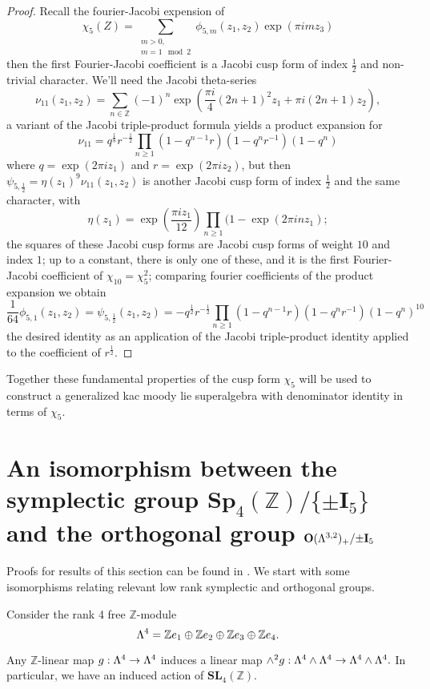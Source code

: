\documentclass[9pt]{amsart} \usepackage[utf8]{inputenc}
\newcommand{\Z}{\mathbb{Z}} \newcommand{\C}{\mathbb{C}}
\newcommand{\Sp}{\mathbf{Sp}}
\newcommand{\SL}{\mathbf{SL}}
\newcommand{\Orth}{\mathbf{O}}
\newcommand{\Id}{\mathbf{I}}
\begin{document}
\begin{proof}
Recall the fourier-Jacobi expension of $$\chi_5(Z) =
\displaystyle\sum_{\substack{m>0,\\m = 1
\mod 2}} \phi_{5,m} (z_1,z_2)\exp (\pi i m z_3)$$
then the first Fourier-Jacobi coefficient is a Jacobi cusp form of index
$\frac{1}{2}$ and non-trivial character. We'll need the Jacobi
theta-series $$\nu_{11}(z_1,z_2) = \displaystyle\sum_{n \in \Z} (-1)^n \exp(\frac{\pi
i}{4} (2n + 1)^2 z_1 + \pi i(2n +1) z_2),$$ a variant of the Jacobi
triple-product formula yields a product expansion for $$\nu_{11} =
q^{\frac{1}{8}}r^{-\frac{1}{2}} \displaystyle\prod_{n \geq 1} (1 - q^{n-1} r ) (1 - q^n
r^{-1}) (1 -q^n)$$ where $q = \exp(2\pi i z_1)$ and $r = \exp(2\pi i
z_2)$, but
then $\psi_{5,\frac{1}{2}} = \eta(z_1)^9 \nu_{11}(z_1,z_2)$ is another
Jacobi cusp form of index $\frac{1}{2}$ and the same character, with
$$\eta(z_1) = \exp(\frac{\pi i z_1}{12}) \displaystyle\prod_{n\geq 1} (1 - \exp(2\pi i n
z_1);$$ the
squares of these Jacobi cusp forms are Jacobi cusp forms of weight $10$
and index $1$; up to a constant, there is only one of these, and it is
the first Fourier-Jacobi coefficient of $\chi_{10} = \chi_5^2$;
comparing fourier coefficients of the product expansion we obtain $$\frac{1}{64}
\phi_{5,1}(z_1,z_2) = \psi_{5,\frac{1}{2}}(z_1,z_2) =
-q^{\frac{1}{2}}r^{-\frac{1}{2}}\displaystyle\prod_{n\geq 1} (1 - q^{n-1}r )(1 -q^n
r^{-1})(1 - q^n)^{10}$$ the
desired identity as an application of the Jacobi triple-product identity
applied to the coefficient of $r^{\frac{1}{2}}$.
\end{proof}
Together these fundamental properties of the cusp form $\chi_5$
will be used to construct a generalized kac moody lie superalgebra with
denominator identity in terms of $\chi_5$.


\section{An isomorphism between
the symplectic group $\Sp_4(\Z)/\{\pm\Id_5\}$ and the orthogonal group
$\Orth(\La^{3,2})_+/{\pm\Id_5}$}

Proofs for results of this section can be found in \cite{KNAPP:1}. We
start with some isomorphisms relating relevant low rank symplectic and
orthogonal groups.


Consider the rank 4 free $\Z$-module $$\La^4 = \Z e_1 \oplus \Z e_2
\oplus \Z e_3 \oplus \Z e_4.$$

Any $\Z$-linear map $g: \Lambda^4 \rightarrow \Lambda^4$ induces a linear map
$\wedge^2 g : \Lambda^4 \wedge \Lambda^4 \rightarrow \Lambda^4 \wedge \Lambda^4.$ In
particular, we have an induced action of $\SL_4(\Z)$.
\end{document}
